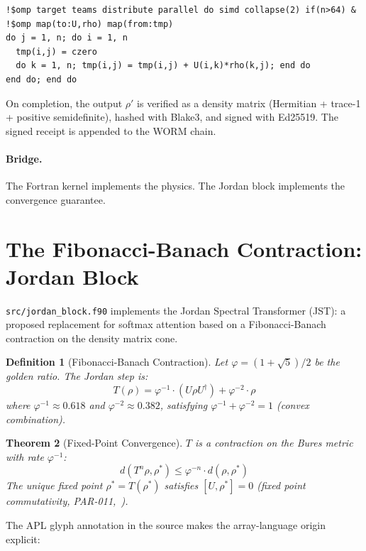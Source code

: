 \documentclass[11pt,a4paper]{article}
\newtheorem{theorem}{Theorem}[section]
\newtheorem{definition}[theorem]{Definition}
\begin{document}
\begin{lstlisting}[language={}]
!$omp target teams distribute parallel do simd collapse(2) if(n>64) &
!$omp map(to:U,rho) map(from:tmp)
do j = 1, n; do i = 1, n
  tmp(i,j) = czero
  do k = 1, n; tmp(i,j) = tmp(i,j) + U(i,k)*rho(k,j); end do
end do; end do
\end{lstlisting}

On completion, the output $\rho'$ is verified as a density matrix
(Hermitian + trace-1 + positive semidefinite), hashed with Blake3, and
signed with Ed25519. The signed receipt is appended to the WORM chain.

\paragraph{Bridge.} The Fortran kernel implements the physics.
The Jordan block implements the convergence guarantee.

\section{The Fibonacci-Banach Contraction: Jordan Block}

\texttt{src/jordan\_block.f90} implements the Jordan Spectral Transformer
(JST): a proposed replacement for softmax attention based on a
Fibonacci-Banach contraction on the density matrix cone.

\begin{definition}[Fibonacci-Banach Contraction]
Let $\varphi = (1+\sqrt{5})/2$ be the golden ratio. The Jordan step is:
\[
T(\rho) = \varphi^{-1} \cdot (U\rho U^\dagger) + \varphi^{-2} \cdot \rho
\]
where $\varphi^{-1} \approx 0.618$ and $\varphi^{-2} \approx 0.382$,
satisfying $\varphi^{-1} + \varphi^{-2} = 1$ (convex combination).
\end{definition}

\begin{theorem}[Fixed-Point Convergence]
$T$ is a contraction on the Bures metric with rate $\varphi^{-1}$:
\[
d(T^n\rho, \rho^*) \leq \varphi^{-n} \cdot d(\rho, \rho^*)
\]
The unique fixed point $\rho^* = T(\rho^*)$ satisfies $[U, \rho^*] = 0$
(fixed point commutativity, PAR-011,~\cite{parr2026jacobian}).
\end{theorem}

The APL glyph annotation in the source makes the array-language origin
explicit:
\end{document}
